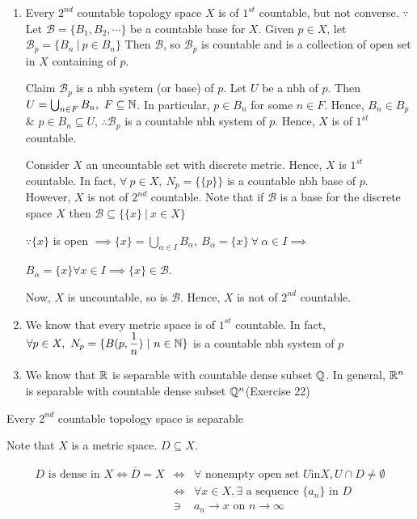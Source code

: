\begin{rmk*} $ $
	\begin{enumerate}[wide]
		\item Every $2^{nd}$ countable topology space $X$ is of $1^{st}$ countable, but not converse. $\because$ Let $\mathscr{B} = \{B_1,B_2,\cdots\}$ be a countable base for $X$. Given $p \in X$, let $\mathscr B_p = \{B_n ~|~ p \in B_n\}$ Then $\mathscr B$, so $\mathscr B_p$ is countable and is a collection of open set in $X$ containing of $p$.
		 
		$ $\\
		Claim $\mathscr B_p$ is a nbh system (or base) of $p$. Let $U$ be a nbh of $p$. Then $U = \bigcup_{n \in F}B_n,~F\subseteq \mathbb{N}$. In particular, $p \in B_n$ for some $n \in F$. Hence, $B_n \in B_p$ $\&$ $p \in B_n \subseteq U$, $\therefore \mathscr B_p$ is a countable nbh system of $p$. Hence, $X$ is of $1^{st}$ countable.
		
		$ $\\
		Consider $X$ an uncountable set with discrete metric. Hence, $X$ is $1^{st}$ countable. In fact, $\forall ~p\in X,~N_p = \{\{p\}\}$ is a countable nbh base of $p$. However, $X$ is not of $2^{nd}$ countable. Note that if $\mathscr B$ is a base for the discrete space $X$ then $\mathscr B \subseteq \{\{x\} ~|~ x \in X\}$
		
		$\because\{x\}$ is open $\implies \{x\} = \bigcup_{\alpha \in I}B_{\alpha},~B_{\alpha} = \{x\}~\forall~ \alpha \in I \implies$
		
		$B_\alpha = \{x\} \forall x \in I \implies \{x\} \in \mathscr B$.
		
		Now, $X$ is uncountable, so is $\mathscr B$. Hence, $X$ is not of $2^{nd}$ countable.
		\item We know that every metric space is of $1^{st}$ countable. In fact, $\forall p \in X,~N_p = \{B(p,\dfrac{1}{n})~|~n \in \mathbb{N}\}$ is a countable nbh system of $p$
		\item We know that $\mathbb{R}$ is separable with countable dense subset $\mathbb{Q}$. In general, $\mathbb{R}^n$ is separable with countable dense subset $\mathbb{Q}^n$(Exercise 22)
	\end{enumerate}
\end{rmk*}

\begin{thm}
	Every $2^{nd}$ countable topology space is separable
\end{thm}

\newpage

\begin{rmk*}
	Note that $X$ is a metric space. $D \subseteq X$.
	
	\begin{eqnarray*}
		D \text{ is dense in } X \Leftrightarrow \overline{D} = X &\Leftrightarrow& \forall \text{ nonempty open set } U \text{in} X, U \cap D \neq \emptyset\\
		&\Leftrightarrow& \forall x \in X, \exists \text{ a sequence } \{a_n\} \text{ in } D \\
		&\ni& a_n \rightarrow x \text{ on } n \rightarrow \infty
	\end{eqnarray*}
	
\end{rmk*}

